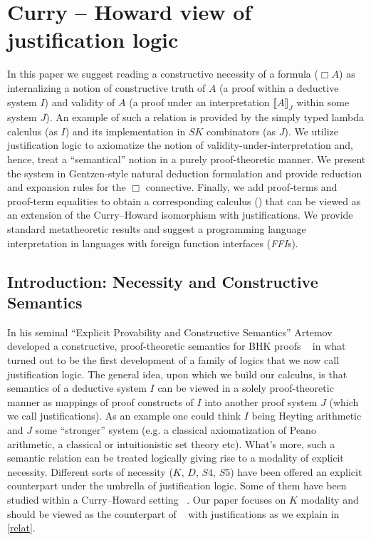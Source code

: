 \chapter{Curry -- Howard view of justification logic}
\label{proposal}
In this paper we suggest reading a constructive necessity  of a formula ($\Box A$) as  internalizing a notion of constructive truth of $A$ 
(a proof within a deductive system $I$) and validity of $A$
(a proof under an interpretation  $\llbracket A \rrbracket_J$ within some system $J$).  An example of such a relation is provided by the simply typed lambda calculus
(as $I$) and its implementation in $SK$ combinators (as $J$). We utilize justification logic to axiomatize the notion of 
validity-under-interpretation and, hence, treat  a  ``semantical'' notion in a purely proof-theoretic manner. We present the system  in 
Gentzen-style  natural deduction formulation  and provide reduction and expansion rules for the $\Box$ connective. Finally, we add proof-terms and proof-term equalities
to obtain a corresponding calculus ({}) that can be viewed as an extension of the Curry--Howard isomorphism with justifications.
We provide standard metatheoretic results  and suggest a 
programming language  interpretation in  languages with foreign function interfaces (\textit{FFI}s).

\section{Introduction: Necessity and Constructive Semantics}
In his seminal ``Explicit Provability and Constructive Semantics'' \cite{Artemov2001} Artemov developed a constructive, proof-theoretic semantics for 
\acs{BHK} proofs ~\cite{Troelstra1988} 
in what turned out to be the first development of a family of logics that we now call justification logic.
The general idea, upon which we build our calculus, is that semantics of a deductive system $I$ can be viewed in a solely proof-theoretic manner 
as mappings of proof constructs of $I$ into another proof system $J$ (which we call justifications).
As an example one could think  $I$  being  Heyting arithmetic and $J$ some  ``stronger'' system 
(e.g. a classical axiomatization of Peano arithmetic, a classical or intuitionistic set theory etc). %
What's more,  such a semantic relation can be treated logically giving  rise to a modality of explicit necessity. Different sorts of necessity
($K$, $D$, $S4$, $S5$) have been offered  an explicit counterpart under the umbrella of justification logic. Some of them have been studied within a
Curry--Howard setting ~\cite{ArtBon07LFCS}. Our paper
focuses on  $K$ modality and  should be viewed as the  counterpart of ~\cite{Bellin2001} with justifications as we explain in \ref{relat}.
